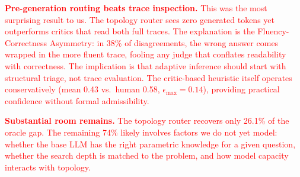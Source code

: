 \documentclass{article}
\begin{document}
\textcolor{red}{\textbf{Pre-generation routing beats trace inspection.}
This was the most surprising result to us. The topology router sees zero generated tokens yet outperforms critics that read both full traces. The explanation is the Fluency-Correctness Asymmetry: in 38\% of disagreements, the wrong answer comes wrapped in the more fluent trace, fooling any judge that conflates readability with correctness. The implication is that adaptive inference should start with structural triage, not trace evaluation. The critic-based heuristic itself operates conservatively (mean 0.43 vs.\ human 0.58, $\epsilon_{\max}=0.14$), providing practical confidence without formal admissibility.}

\textcolor{red}{\textbf{Substantial room remains.}
The topology router recovers only 26.1\% of the oracle gap. The remaining 74\% likely involves factors we do not yet model: whether the base LLM has the right parametric knowledge for a given question, whether the search depth is matched to the problem, and how model capacity interacts with topology.}



\end{document}
